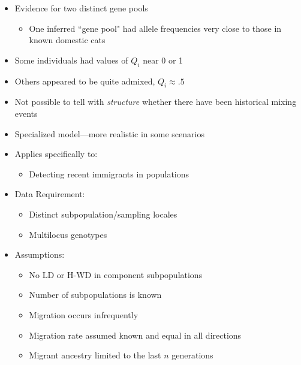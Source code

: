 \begin{itemize}
\item Evidence for two distinct gene pools
\begin{itemize}
\item One inferred ``gene pool" had allele frequencies very close to
those in known domestic cats
\end{itemize}
\item Some individuals had values of $Q_i$ near 0 or 1
\item Others appeared to be quite admixed, $Q_i \approx .5$
\item Not possible to tell with {\sl structure} whether there have been
historical mixing events
\end{itemize}


\begin{itemize}
\item Specialized model---more realistic in some scenarios
\item Applies specifically to:
\begin{itemize}
\item Detecting recent immigrants in populations
\end{itemize}
\item Data Requirement:
\begin{itemize}
\item Distinct subpopulation/sampling locales 
\item Multilocus genotypes
\end{itemize}
\item Assumptions:
\begin{itemize}
\item No LD or H-WD in component subpopulations
\item Number of subpopulations is known
\item Migration occurs infrequently
\item Migration rate assumed known and equal in all directions
\item Migrant ancestry limited to the last $n$ generations
\end{itemize}
\end{itemize}




%


